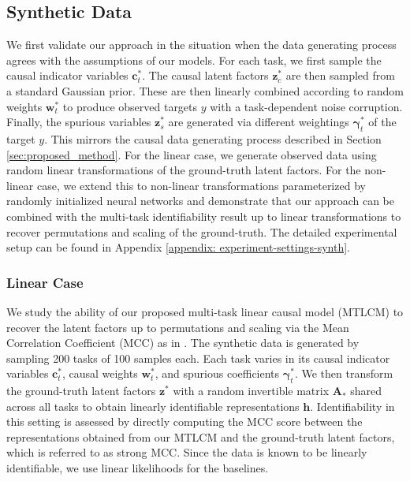 \documentclass[10pt]{article} %
\theoremstyle{plain}
\theoremstyle{definition}
\begin{document}
\subsection{Synthetic Data}\label{sec:synthetic_exp}
We first validate our approach in the situation when the data generating process 
agrees with the assumptions of our models. For each task, we first sample the causal indicator variables $\mathbf{c}_t^*$. The causal latent factors $\mathbf{z}_c^*$ are then sampled from a standard Gaussian prior. These are then linearly combined according to random weights $\mathbf{w}_t^*$ to produce observed 
targets $y$ with a task-dependent noise corruption. Finally, the spurious variables $\mathbf{z}_s^*$ are generated via different weightings $\boldsymbol{\gamma}_t^*$ of the target $y$. This mirrors the causal data generating process described in Section \ref{sec:proposed_method}. For the linear case, we generate
observed data using random linear transformations of the ground-truth latent factors. 
For the non-linear case, we extend this to non-linear transformations parameterized by randomly initialized neural networks and demonstrate that our approach can be combined with 
the multi-task identifiability result up to linear transformations to recover permutations and scaling of the ground-truth. The detailed experimental setup can be found in Appendix \ref{appendix: experiment-settings-synth}.


\subsubsection{Linear Case}
We study the ability of our proposed multi-task linear causal model (MTLCM) to recover the latent factors up to permutations and scaling via the Mean Correlation Coefficient (MCC) as in \citet{Khemakhem_Kingma_Monti_Hyvarinen_2020}. The synthetic data is generated by sampling 200 tasks of 100 samples each. Each task
varies in its causal indicator variables $\mathbf{c}_t^*$, causal weights $\mathbf{w}_t^*$, and spurious coefficients $\boldsymbol{\gamma}_t^*$. We then transform the ground-truth latent factors $\mathbf{z}^*$ with a random invertible matrix $\mathbf{A}_*$ shared across all tasks to obtain linearly identifiable representations $\mathbf{h}$.
Identifiability in this setting is assessed by directly computing the MCC score between the representations obtained from our MTLCM and the ground-truth latent factors, which is referred to as strong MCC.
Since the data is known to be linearly identifiable, we use linear likelihoods for the baselines.
\end{document}

